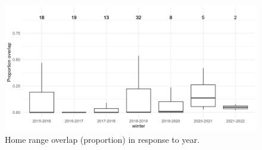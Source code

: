 \documentclass[
]{article}
\begin{document}
\begin{figure}
\centering
\includegraphics{output/figures/hr_overlap.jpeg}
\caption{Home range overlap (proportion) in response to year.}
\end{figure}
\end{document}
